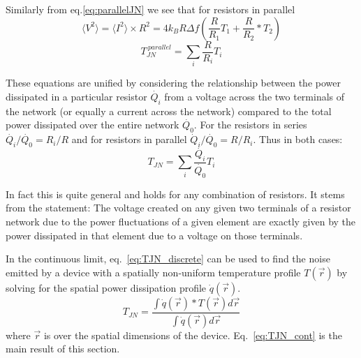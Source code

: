 Similarly from eq.\ref{eq:parallelJN} we see that for resistors in parallel
\begin{equation}
\langle V^2\rangle = \langle I^2\rangle\times R^2 = 4k_BR\Delta f (\frac{R}{R_1}T_1+\frac{R}{R_2}*T_2)
\end{equation}
\begin{equation}
T_{JN}^{\ parallel} = \sum_i \frac{R}{R_i}T_i
\end{equation}

These equations are unified by considering the relationship between the power dissipated in a particular resistor $\dot{Q_i}$ from a voltage across the two terminals of the network (or equally a current across the network) compared to the total power dissipated over the entire network $\dot{Q_0}$. For the resistors in series $\dot{Q_i}/\dot{Q_0} = R_i/R$ and for resistors in parallel $\dot{Q}_i/\dot{Q_0} = R/R_i$. Thus in both cases:
\begin{equation}\label{eq:TJN_discrete}
T_{JN} = \sum_i\frac{\dot{Q_i}}{\dot{Q_0}}T_i
\end{equation}

In fact this is quite general and holds for any combination of resistors. It stems from the statement: The voltage created on any given two terminals of a resistor network due to the power fluctuations of a given element are exactly given by the power dissipated in that element due to a voltage on those terminals.

In the continuous limit, eq.~\ref{eq:TJN_discrete} can be used to find the noise emitted by a device with a spatially non-uniform temperature profile $T(\vec{r})$ by solving for the spatial power dissipation profile $\dot{q}(\vec{r})$.
\begin{equation}\label{eq:TJN_cont}
T_{JN} = \frac{\int \dot{q}(\vec{r})*T(\vec{r}) d\vec{r}}{\int \dot{q}(\vec{r}) d\vec{r}}
\end{equation}
where $\vec{r}$ is over the spatial dimensions of the device. Eq.~\ref{eq:TJN_cont} is the main result of this section.


